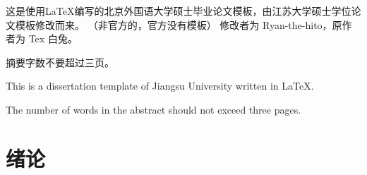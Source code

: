 \documentclass{BFSU-master-thesis}
\begin{document}

\frontmatter

\maketitle             %

\makeauthorization     %


\begin{cnabstract}
这是使用\LaTeX{}编写的北京外国语大学硕士毕业论文模板，由江苏大学硕士学位论文模板修改而来。
（非官方的，官方没有模板） 修改者为 Ryan-the-hito，原作者为 Tex 白兔。

摘要字数不要超过三页。

\zhlipsum[1-2]     %

\end{cnabstract}


\begin{enabstract}

This is a dissertation template of Jiangsu University written in \LaTeX{}.

The number of words in the abstract should not exceed three pages.

\lipsum[1-3]


\end{enabstract}


\tableofcontents      %

\listoffigures        %

\mainmatter


\chapter*{绪\quad 论}
\end{document}
